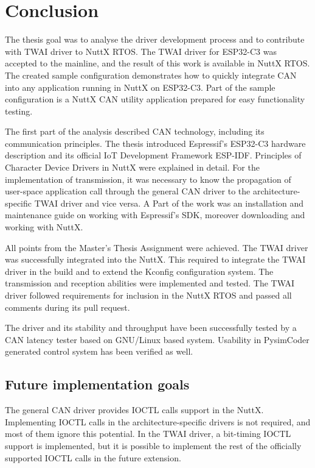 \documentclass{ctuthesis}
\begin{document}
 \chapter{Conclusion}
 \label{ch:conclusion}
 The thesis goal was to analyse the driver development process and to contribute with TWAI driver to NuttX RTOS. The TWAI driver for ESP32-C3 was accepted to the mainline, and the result of this work is available in NuttX RTOS\cite{merge}. The created sample configuration demonstrates how to quickly integrate CAN into any application running in NuttX on ESP32-C3. Part of the sample configuration is a NuttX CAN utility application prepared for easy functionality testing.\newline

 \quad The first part of the analysis described CAN technology, including its communication principles. The thesis introduced Espressif's ESP32-C3 hardware description and its official IoT Development Framework ESP-IDF. Principles of Character Device Drivers in NuttX were explained in detail. For the implementation of transmission, it was necessary to know the propagation of user-space application call through the general CAN driver to the architecture-specific TWAI driver and vice versa. A Part of the work was an installation and maintenance guide on working with Espressif's SDK, moreover downloading and working with NuttX. \newline

 \quad All points from the Master's Thesis Assignment were achieved. The TWAI driver was successfully integrated into the NuttX. This required to integrate the TWAI driver in the build and to extend the Kconfig configuration system. The transmission and reception abilities were implemented and tested. The TWAI driver followed requirements for inclusion in the NuttX RTOS and passed all comments during its pull request.\newline

 \quad The driver and its stability and throughput have been successfully tested by a CAN latency tester based on GNU/Linux based system. Usability in PysimCoder generated control system has been verified as well.

 
 \section{Future implementation goals}
  The general CAN driver provides IOCTL calls support in the NuttX. Implementing IOCTL calls in the architecture-specific drivers is not required, and most of them ignore this potential. In the TWAI driver, a bit-timing IOCTL support is implemented, but it is possible to implement the rest of the officially supported IOCTL calls in the future extension. \newline
\end{document}
